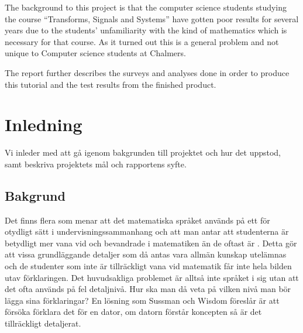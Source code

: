 \documentclass[]{article}
\begin{document}
The background to this project is that the computer science students studying
the course ``Transforms, Signals and Systems'' have gotten poor results for
several years due to the students' unfamiliarity with the kind of mathematics
which is necessary for that course. As it turned out this is a general problem
and not unique to Computer science students at Chalmers.

The report further describes the surveys and analyses done in order to produce
this tutorial and the test results from the finished product.

\newpage


\newpage

\tableofcontents

\newpage

\printglossary[title=Ordlista,nonumberlist]

\newpage

\section{Inledning}
Vi inleder med att gå igenom bakgrunden till projektet och hur det
uppstod, samt beskriva projektets mål och rapportens syfte.

\subsection{Bakgrund}
%

Det finns flera som menar att det matematiska språket används på ett för
otydligt sätt i undervisningssammanhang och att man antar att studenterna
är betydligt mer vana vid och bevandrade i matematiken än de oftast är
\cite{sussman2002role} \cite{wells1995communicating}.
Detta gör att vissa grundläggande detaljer som då antas vara allmän kunskap
utelämnas och de studenter som inte är tillräckligt vana vid matematik får inte
hela bilden utav förklaringen.
Det huvudsakliga problemet är alltså inte språket i sig utan att det ofta
används på fel detaljnivå. Hur ska man då veta på vilken nivå man bör lägga
sina förklaringar? En lösning som Sussman och Wisdom föreslår är att
försöka förklara det för en dator, om datorn förstår koncepten så är det
tillräckligt detaljerat.
\end{document}
